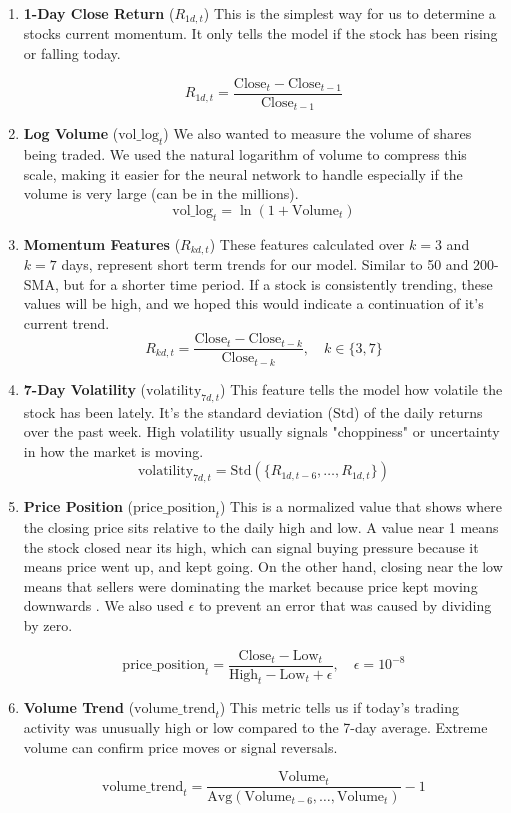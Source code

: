 \documentclass[letterpaper,12pt, twocolumn]{report}
\begin{document}
\begin{enumerate}
    \item \textbf{1-Day Close Return} ($R_{1d, t}$)
    This is the simplest way for us to determine a stocks current momentum. It only tells the model if the stock has been rising or falling today.

    \small
    $$
    R_{1d, t} = \frac{\text{Close}_t - \text{Close}_{t-1}}{\text{Close}_{t-1}}
    $$
    \normalsize

    \item \textbf{Log Volume} ($\text{vol\_log}_t$)
    We also wanted to measure the volume of shares being traded. We used the natural logarithm of volume to compress this scale, making it easier for the neural network to handle especially if the volume is very large (can be in the millions).
    $$
    \text{vol\_log}_t = \ln(1 + \text{Volume}_t)
    $$

    \item \textbf{Momentum Features} ($R_{kd, t}$)
    These features calculated over $k=3$ and $k=7$ days, represent short term trends for our model. Similar to 50 and 200-SMA, but for a shorter time period. If a stock is consistently trending, these values will be high, and we hoped this would indicate a continuation of it's current trend.
    $$
    R_{kd, t} = \frac{\text{Close}_t - \text{Close}_{t-k}}{\text{Close}_{t-k}}, \quad k \in \{3, 7\}
    $$

    \item \textbf{7-Day Volatility} ($\text{volatility}_{7d, t}$)
    This feature tells the model how volatile the stock has been lately. It's the standard deviation ($\text{Std}$) of the daily returns over the past week. High volatility usually signals "choppiness" or uncertainty in how the market is moving.
    $$
    \text{volatility}_{7d, t} = \text{Std}(\{R_{1d, t-6}, \dots, R_{1d, t}\})
    $$

    \item \textbf{Price Position} ($\text{price\_position}_t$)
    This is a normalized value that shows where the closing price sits relative to the daily high and low. A value near 1 means the stock closed near its high, which can signal buying pressure because it means price went up, and kept going. On the other hand, closing near the low means that sellers were dominating the market because price kept moving downwards . We also used $\epsilon$ to prevent an error that was caused by dividing by zero.
    
    \scriptsize
    $$
    \text{price\_position}_t = \frac{\text{Close}_t - \text{Low}_t}{\text{High}_t - \text{Low}_t + \epsilon}, \quad \epsilon = 10^{-8}
    $$
    \normalsize

    \item \textbf{Volume Trend} ($\text{volume\_trend}_t$)
    This metric tells us if today's trading activity was unusually high or low compared to the 7-day average. Extreme volume can confirm price moves or signal reversals.
    
    \scriptsize
    $$
    \text{volume\_trend}_t = \frac{\text{Volume}_t}{\text{Avg}(\text{Volume}_{t-6}, \dots, \text{Volume}_t)} - 1
    $$
    \normalsize
\end{enumerate}
\end{document}
